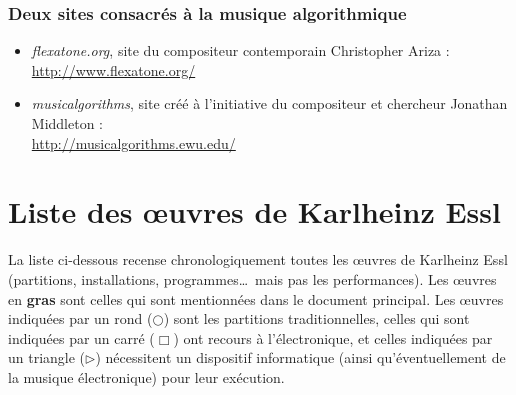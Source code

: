 \documentclass[a4paper,12pt]{article}
\begin{document}
\subsubsection*{Deux sites consacrés à la musique algorithmique}

\begin{itemize}
\item \emph{flexatone.org}, site du compositeur contemporain Christopher Ariza : \\ \href{http://www.flexatone.org/}{http://www.flexatone.org/}
\item \emph{musicalgorithms}, site créé à l'initiative du compositeur et chercheur Jonathan Middleton : \\ \href{http://musicalgorithms.ewu.edu/}{http://musicalgorithms.ewu.edu/}
\end{itemize}

\newpage
\section{Liste des œuvres de Karlheinz Essl}

La liste ci-dessous recense chronologiquement toutes les œuvres de Karlheinz Essl (partitions, installations, programmes\dots~mais pas les performances). Les œuvres en \textbf{gras} sont celles qui sont mentionnées dans le document principal. Les œuvres indiquées par un rond ($\bigcirc$) sont les partitions traditionnelles, celles qui sont indiquées par un carré ($\Box$) ont recours à l'électronique, et celles indiquées par un triangle ($\rhd$) nécessitent un dispositif informatique (ainsi qu'éventuellement de la musique électronique) pour leur exécution.
\end{document}
